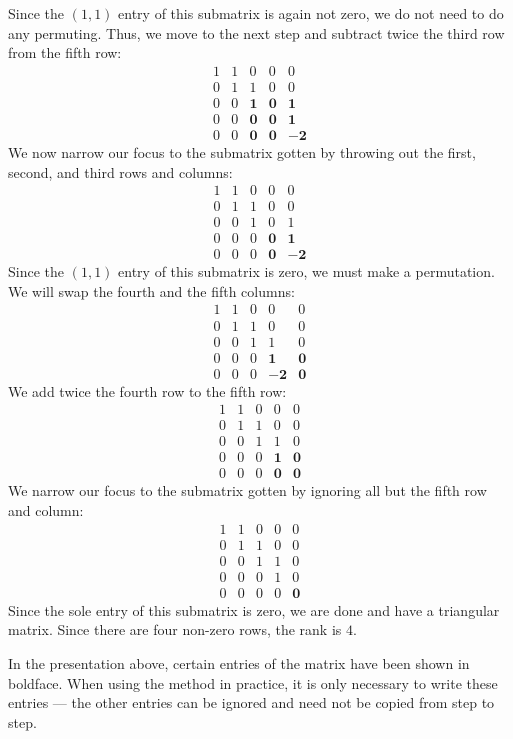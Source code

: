 \documentclass[12pt]{article}
\begin{document}
Since the $(1,1)$ entry of this submatrix is again not zero,
we do not need to do any permuting.  Thus, we move to the
next step and subtract twice the third row from the fifth row:
\[
\begin{matrix}
1 & 1 & 0 & 0 & 0 \\
0 & 1 & 1 & 0 & 0 \\
0 & 0 & \mathbf{1} & \mathbf{0} & \mathbf{1} \\
0 & 0 & \mathbf{0} & \mathbf{0} & \mathbf{1} \\
0 & 0 & \mathbf{0} & \mathbf{0} & \mathbf{-2}
\end{matrix}
\]
We now narrow our focus to the submatrix gotten by throwing
out the first, second, and third rows and columns:
\[
\begin{matrix}
1 & 1 & 0 & 0 & 0 \\
0 & 1 & 1 & 0 & 0 \\
0 & 0 & 1 & 0 & 1 \\
0 & 0 & 0 & \mathbf{0} & \mathbf{1} \\
0 & 0 & 0 & \mathbf{0} & \mathbf{-2}
\end{matrix}
\]
Since the $(1,1)$ entry of this submatrix is zero, we must make
a permutation.  We will swap the fourth and the fifth columns:
\[
\begin{matrix}
1 & 1 & 0 & 0 & 0 \\
0 & 1 & 1 & 0 & 0 \\
0 & 0 & 1 & 1 & 0 \\
0 & 0 & 0 & \mathbf{1} & \mathbf{0} \\
0 & 0 & 0 & \mathbf{-2} & \mathbf{0}
\end{matrix}
\]
We add twice the fourth row to the fifth row:
\[
\begin{matrix}
1 & 1 & 0 & 0 & 0 \\
0 & 1 & 1 & 0 & 0 \\
0 & 0 & 1 & 1 & 0 \\
0 & 0 & 0 & \mathbf{1} & \mathbf{0} \\
0 & 0 & 0 & \mathbf{0} & \mathbf{0}
\end{matrix}
\]
We narrow our focus to the submatrix gotten by ignoring 
all but the fifth row and column:
\[
\begin{matrix}
1 & 1 & 0 & 0 & 0 \\
0 & 1 & 1 & 0 & 0 \\
0 & 0 & 1 & 1 & 0 \\
0 & 0 & 0 & 1 & 0 \\
0 & 0 & 0 & 0 & \mathbf{0}
\end{matrix}
\]
Since the sole entry of this submatrix is zero, we are done
and have a triangular matrix.  Since there are four
non-zero rows, the rank is $4$.

In the presentation above, certain entries of the matrix have been
shown in boldface.  When using the method in practice, it is only
necessary to write these entries --- the other entries can be
ignored and need not be copied from step to step.
\end{document}
